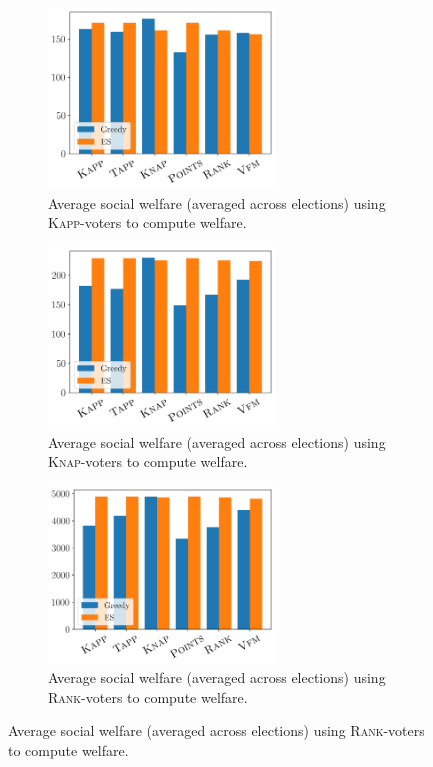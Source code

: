 \documentclass[runningheads]{llncs}
\newcommand{\rank}{\textsc{Rank}}
\newcommand{\knap}{\textsc{Knap}}
\newcommand{\kapp}{\textsc{Kapp}}
\begin{document}
\begin{figure}[ht]
     \centering
          \begin{subfigure}[b]{0.45\textwidth}
         \centering
       \includegraphics[width=6cm]{experiment/k_approval_welfare.png}
\caption{Average social welfare (averaged across elections) using \kapp{}-voters to compute welfare.
}\label{fig:kapp_welfare}
     \end{subfigure}\hfill
     \begin{subfigure}[b]{0.45\textwidth}
         \centering
         \includegraphics[width=6cm]{experiment/Knapsack_welfare.png}
\caption{Average social welfare (averaged across elections) using \knap{}-voters to compute welfare.
}\label{fig:knap_welfare}
     \end{subfigure}
     \hfill
     \begin{subfigure}[b]{0.45\textwidth}
         \centering
         \includegraphics[width=6cm]{experiment/Ranking_value_welfare.png}
\caption{Average social welfare (averaged across elections) using \rank{}-voters to compute welfare.
}\label{fig:rank_welfare}
     \end{subfigure}

\end{figure}
\end{document}
